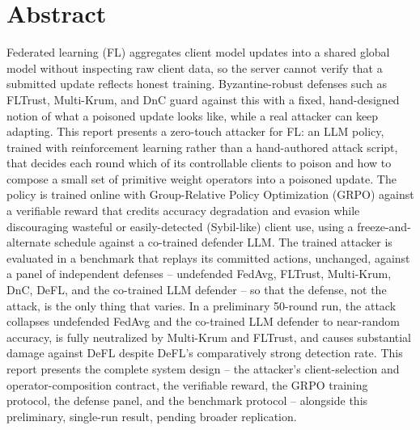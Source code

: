 \chapter*{Abstract}

Federated learning (FL) aggregates client model updates into a shared global model without inspecting raw client data, so the server cannot verify that a submitted update reflects honest training. Byzantine-robust defenses such as FLTrust, Multi-Krum, and DnC guard against this with a fixed, hand-designed notion of what a poisoned update looks like, while a real attacker can keep adapting. This report presents a zero-touch attacker for FL: an LLM policy, trained with reinforcement learning rather than a hand-authored attack script, that decides each round which of its controllable clients to poison and how to compose a small set of primitive weight operators into a poisoned update. The policy is trained online with Group-Relative Policy Optimization (GRPO) against a verifiable reward that credits accuracy degradation and evasion while discouraging wasteful or easily-detected (Sybil-like) client use, using a freeze-and-alternate schedule against a co-trained defender LLM. The trained attacker is evaluated in a benchmark that replays its committed actions, unchanged, against a panel of independent defenses -- undefended FedAvg, FLTrust, Multi-Krum, DnC, DeFL, and the co-trained LLM defender -- so that the defense, not the attack, is the only thing that varies. In a preliminary 50-round run, the attack collapses undefended FedAvg and the co-trained LLM defender to near-random accuracy, is fully neutralized by Multi-Krum and FLTrust, and causes substantial damage against DeFL despite DeFL's comparatively strong detection rate. This report presents the complete system design -- the attacker's client-selection and operator-composition contract, the verifiable reward, the GRPO training protocol, the defense panel, and the benchmark protocol -- alongside this preliminary, single-run result, pending broader replication.
